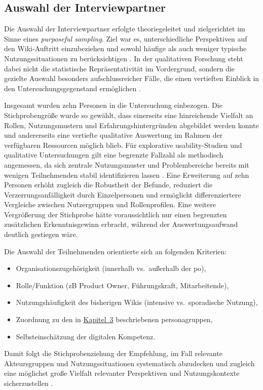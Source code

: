 \subsection{Auswahl der Interviewpartner}
\label{subsec:04-02-01_sampling-and-selection}

Die Auswahl der Interviewpartner erfolgte theoriegeleitet und zielgerichtet im Sinne eines \textit{purposeful sampling}. Ziel war es, unterschiedliche Perspektiven auf den Wiki-Auftritt einzubeziehen und sowohl häufige als auch weniger typische Nutzungssituationen zu berücksichtigen \cite{422:Flick2018,119:PurposefulSampling2015}. In der qualitativen Forschung steht dabei nicht die statistische Repräsentativität im Vordergrund, sondern die gezielte Auswahl besonders aufschlussreicher Fälle, die einen vertieften Einblick in den Untersuchungsgegenstand ermöglichen \cite{119:PurposefulSampling2015}.

Insgesamt wurden zehn Personen in die Untersuchung einbezogen. Die Stichprobengröße wurde so gewählt, dass einerseits eine hinreichende Vielfalt an Rollen, Nutzungsmustern und Erfahrungshintergründen abgebildet werden konnte und andererseits eine vertiefte qualitative Auswertung im Rahmen der verfügbaren Ressourcen möglich blieb. Für explorative \Gls{usability}-Studien und qualitative Untersuchungen gilt eine begrenzte Fallzahl als methodisch angemessen, da sich zentrale Nutzungsmuster und Problembereiche bereits mit wenigen Teilnehmenden stabil identifizieren lassen \cite{104:Nielsen2000FiveUsers}. Eine Erweiterung auf zehn Personen erhöht zugleich die Robustheit der Befunde, reduziert die Verzerrungsanfälligkeit durch Einzelpersonen und ermöglicht differenziertere Vergleiche zwischen Nutzergruppen und Rollenprofilen. Eine weitere Vergrößerung der Stichprobe hätte voraussichtlich nur einen begrenzten zusätzlichen Erkenntnisgewinn erbracht, während der Auswertungsaufwand deutlich gestiegen wäre.

Die Auswahl der Teilnehmenden orientierte sich an folgenden Kriterien:
\begin{itemize}
  \item Organisationszugehörigkeit (innerhalb vs.\ außerhalb der \acrshort{po}),
  \item Rolle/Funktion (\acrshort{zB} Product Owner, Führungskraft, Mitarbeitende),
  \item Nutzungshäufigkeit des bisherigen Wikis (intensive vs.\ sporadische Nutzung),
  \item Zuordnung zu den in \hyperref[ch:03_pre-analysis]{Kapitel~3} beschriebenen \Gls{personagruppen},
  \item Selbsteinschätzung der digitalen Kompetenz.
\end{itemize}
Damit folgt die Stichprobenziehung der Empfehlung, im Fall relevante Akteursgruppen und Nutzungssituationen systematisch abzudecken und zugleich eine möglichst große Vielfalt relevanter Perspektiven und Nutzungskontexte sicherzustellen \cite{422:Flick2018,119:PurposefulSampling2015}.

